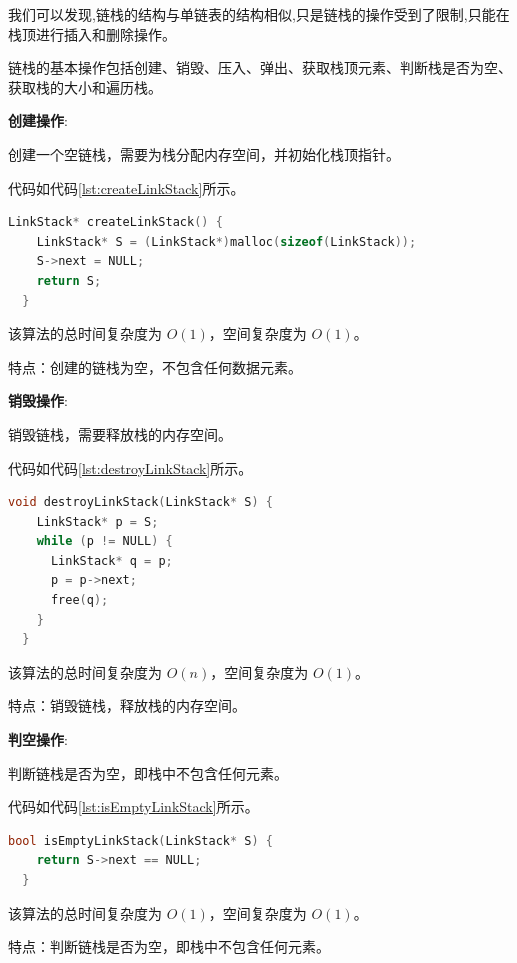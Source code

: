 \documentclass[lang=cn,newtx,10pt,scheme=chinese]{../elegantbook}
\begin{document}
我们可以发现,链栈的结构与单链表的结构相似,只是链栈的操作受到了限制,只能在栈顶进行插入和删除操作。

链栈的基本操作包括创建、销毁、压入、弹出、获取栈顶元素、判断栈是否为空、获取栈的大小和遍历栈。

\textbf{创建操作}:

创建一个空链栈，需要为栈分配内存空间，并初始化栈顶指针。

代码如代码\ref{lst:createLinkStack}所示。

\begin{lstlisting}[language=C++, caption={创建一个空链栈示例代码}, label={lst:createLinkStack}]
  LinkStack* createLinkStack() {
    LinkStack* S = (LinkStack*)malloc(sizeof(LinkStack));
    S->next = NULL;
    return S;
  }

\end{lstlisting}

该算法的总时间复杂度为 $O(1)$，空间复杂度为 $O(1)$。

特点：创建的链栈为空，不包含任何数据元素。

\textbf{销毁操作}:

销毁链栈，需要释放栈的内存空间。

代码如代码\ref{lst:destroyLinkStack}所示。

\begin{lstlisting}[language=C++, caption={销毁链栈示例代码}, label={lst:destroyLinkStack}]
  void destroyLinkStack(LinkStack* S) {
    LinkStack* p = S;
    while (p != NULL) {
      LinkStack* q = p;
      p = p->next;
      free(q);
    }
  }

\end{lstlisting}

该算法的总时间复杂度为 $O(n)$，空间复杂度为 $O(1)$。

特点：销毁链栈，释放栈的内存空间。

\textbf{判空操作}:

判断链栈是否为空，即栈中不包含任何元素。

代码如代码\ref{lst:isEmptyLinkStack}所示。

\begin{lstlisting}[language=C++, caption={判断链栈是否为空示例代码}, label={lst:isEmptyLinkStack}]
  bool isEmptyLinkStack(LinkStack* S) {
    return S->next == NULL;
  }

\end{lstlisting}

该算法的总时间复杂度为 $O(1)$，空间复杂度为 $O(1)$。

特点：判断链栈是否为空，即栈中不包含任何元素。
\end{document}
